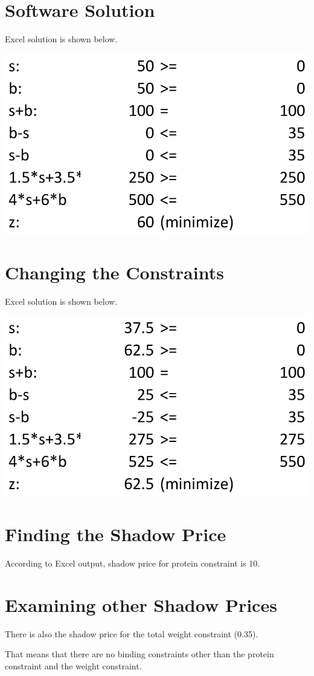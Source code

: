 \documentclass{article}
\begin{document}
\section{Software Solution}

Excel solution is shown below.

\includegraphics*{software.png}

\section{Changing the Constraints}

Excel solution is shown below.

\includegraphics*{software2.png}

\section{Finding the Shadow Price}

According to Excel output, shadow price for protein constraint is 10.

\section{Examining other Shadow Prices}

There is also the shadow price for the total weight constraint (0.35).

That means that there are no binding constraints other than the protein constraint and the weight constraint.
\end{document}
